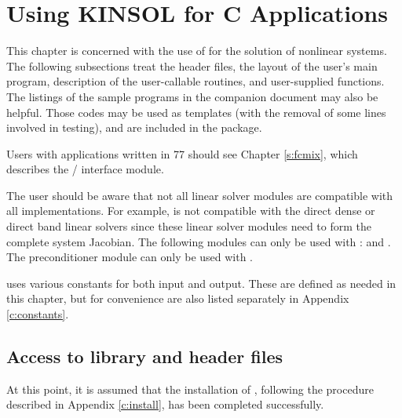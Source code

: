 \chapter{Using KINSOL for C Applications}\label{c:usage}

This chapter is concerned with the use of {\kinsol} for the solution
of nonlinear systems. The following subsections treat the header
files, the layout of the user's main program, description of the
{\kinsol} user-callable routines, and user-supplied functions.
The listings of the sample programs in the companion document
\cite{kinsol_ex} may also be helpful.  Those codes may be used as
templates (with the removal of some lines involved in testing), and
are included in the {\kinsol} package.

Users with applications written in {\F}77 should see Chapter \ref{s:fcmix},
which describes the {\F}/{\C} interface module.

The user should be aware that not all linear solver modules are compatible 
with all {\nvector} implementations. 
For example, {\nvecp} is not compatible with the direct dense or direct band 
linear solvers since these linear solver modules need to form the complete
system Jacobian. The following {\kinsol} modules can only be used with {\nvecs}:
{\kindense} and {\kinband}. The preconditioner module {\kinbbdpre}
can only be used with {\nvecp}.

{\kinsol} uses various constants for both input and output. These are
defined as needed in this chapter, but for convenience are also listed
separately in Appendix \ref{c:constants}.

\section{Access to library and header files}\label{ss:file_access}

At this point, it is assumed that the installation of {\kinsol},
following the procedure described in Appendix \ref{c:install}, has
been completed successfully.

